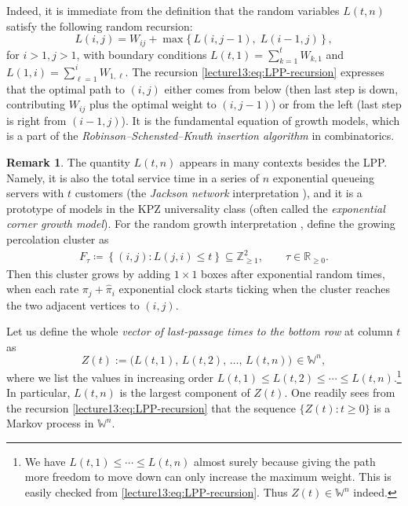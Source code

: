 \documentclass[letterpaper,11pt,oneside,reqno]{book}
\numberwithin{equation}{chapter}  %
\theoremstyle{definition}
\newtheorem{remark}[proposition]{Remark}
\begin{document}
Indeed, it is immediate from the definition that the random
variables $L(t,n)$ satisfy the following random recursion:
\begin{equation}\label{lecture13:eq:LPP-recursion}
L(i,j) = W_{ij} + \max\{\, L(i,j-1),\; L(i-1,j)\,\}\,,
\end{equation}
for $i>1, j>1$, with boundary conditions $L(t,1) =
\sum_{k=1}^t W_{k,1}$ and $L(1,i) =
\sum_{\ell=1}^i W_{1,\ell}$.
The recursion \eqref{lecture13:eq:LPP-recursion} expresses
that the optimal path to $(i,j)$ either comes from below
(then last step is down, contributing $W_{ij}$ plus the
optimal weight to $(i,j-1)$) or from the left (last step is
right from $(i-1,j)$). It is the fundamental equation of
growth models, which is a part of the
\emph{Robinson--Schensted--Knuth insertion algorithm} in
combinatorics.


\begin{remark}
	The quantity $L(t,n)$ appears in many contexts besides the LPP.
	Namely,
it is also the total
service time in a series of $n$ exponential queueing servers
with $t$ customers (the \emph{Jackson network}
interpretation \cite{Baryshnikov_GUE2001}), and it is a
prototype of models in the KPZ universality class (often
called the \emph{exponential corner growth model}).
For the random growth interpretation \cite{johansson2000shape},
define the growing percolation cluster as
\begin{equation*}
\begin{split}
F_\tau\coloneqq
\left\{ (i,j)\colon L(j,i)\le t \right\} \subseteq \mathbb{Z}_{\ge1}^2,
\qquad \tau \in \mathbb{R}_{\ge0}.
\end{split}
\end{equation*}
Then this cluster grows by adding $1\times 1$ boxes
after exponential random times, when
each rate $\pi_j+\hat \pi_i$
exponential clock starts ticking
when the cluster reaches the two adjacent vertices
to $(i,j)$.
\end{remark}

Let us define the whole \emph{vector of last-passage times to the bottom row} at column $t$ as
\[ Z(t) := \big( L(t,1),\, L(t,2),\, \dots,\, L(t,n)\big)\,\in \mathbb{W}^n, \]
where we list the values in increasing order $L(t,1)\le
L(t,2)\le \cdots \le L(t,n)$.\footnote{We have $L(t,1)\le
\cdots\le L(t,n)$ almost surely because giving the path more
freedom to move down can only increase the maximum weight.
This is easily checked from \eqref{lecture13:eq:LPP-recursion}. Thus
$Z(t)\in \mathbb{W}^n$ indeed.} In particular, $L(t,n)$ is
the largest component of $Z(t)$.
One readily sees from the recursion \eqref{lecture13:eq:LPP-recursion} that
the sequence
$\{Z(t):t\ge0\}$ is a Markov
process in $\mathbb{W}^n$.
\end{document}
